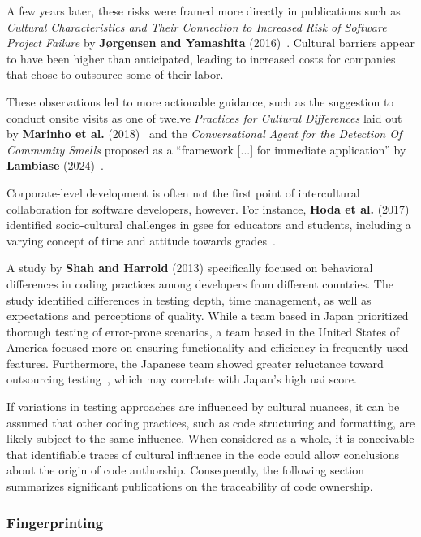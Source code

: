 A few years later, these risks were framed more directly in publications such as \textit{Cultural Characteristics and Their Connection to Increased Risk of Software Project Failure} by \textbf{Jørgensen and Yamashita} (2016)~\cite{Joergensen2016}.
Cultural barriers appear to have been higher than anticipated, leading to increased costs for companies that chose to outsource some of their labor.

These observations led to more actionable guidance, such as the suggestion to conduct onsite visits as one of twelve \textit{Practices for Cultural Differences} laid out by \textbf{Marinho et al.} (2018)~\cite{Marinho2018} and the \textit{Conversational Agent for the Detection Of Community Smells} proposed as a ``framework [...] for immediate application'' by \textbf{Lambiase} (2024)~\cite{Lambiase2024}.

Corporate-level development is often not the first point of intercultural collaboration for software developers, however.
For instance, \textbf{Hoda et al.} (2017) identified socio-cultural challenges in \ac{gsee} for educators and students, including a varying concept of time and attitude towards grades~\cite{Hoda2017}.

A study by \textbf{Shah and Harrold} (2013) specifically focused on behavioral differences in coding practices among developers from different countries.
The study identified differences in testing depth, time management, as well as expectations and perceptions of quality.
While a team based in Japan prioritized thorough testing of error-prone scenarios, a team based in the United States of America focused more on ensuring functionality and efficiency in frequently used features.
Furthermore, the Japanese team showed greater reluctance toward outsourcing testing~\cite{Shah2013}, which may correlate with Japan's high \ac{uai} score.

If variations in testing approaches are influenced by cultural nuances, it can be assumed that other coding practices, such as code structuring and formatting, are likely subject to the same influence.
When considered as a whole, it is conceivable that identifiable traces of cultural influence in the code could allow conclusions about the origin of code authorship.
Consequently, the following section summarizes significant publications on the traceability of code ownership.


\subsubsection{Fingerprinting}
\label{sec:related-work-culture-fingerprinting}


